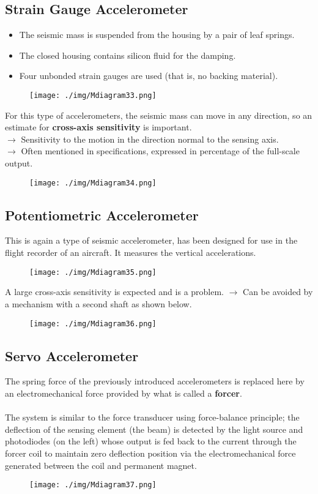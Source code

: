 \subsection{Strain Gauge Accelerometer}
\begin{itemize}
  \item The seismic mass is suspended from the housing by a pair of leaf springs.
  \item The closed housing contains silicon fluid for the damping.
  \item Four unbonded strain gauges are used (that is, no backing material).
\end{itemize}
\begin{figure}[H]
  \centering
  \texttt{[image: ./img/Mdiagram33.png]}
\end{figure}
For this type of accelerometers, the seismic mass can move in any direction, so an estimate for \textbf{cross-axis sensitivity} is important. \\
$\rightarrow$ Sensitivity to the motion in the direction normal to the sensing axis. \\
$\rightarrow$ Often mentioned in specifications, expressed in percentage of the full-scale output.
\begin{figure}[H]
  \centering
  \texttt{[image: ./img/Mdiagram34.png]}
\end{figure}
\subsection{Potentiometric Accelerometer}
This is again a type of seismic accelerometer, has been designed for use in the flight recorder of an aircraft. It measures the vertical accelerations.
\begin{figure}[H]
  \centering
  \texttt{[image: ./img/Mdiagram35.png]}
\end{figure}
A large cross-axis sensitivity is expected and is a problem. $\longrightarrow$ Can be avoided by a mechanism with a second shaft as shown below.
\begin{figure}[H]
  \centering
  \texttt{[image: ./img/Mdiagram36.png]}
\end{figure}
\subsection{Servo Accelerometer}
The spring force of the previously introduced accelerometers is replaced here by an electromechanical force provided by what is called a \textbf{forcer}. \\\\
The system is similar to the force transducer using force-balance principle; the deflection of the sensing element (the beam) is detected by the light source and photodiodes (on the left) whose output is fed back to the current through the forcer coil to maintain zero deflection position via the electromechanical force generated between the coil and permanent magnet.
\begin{figure}[H]
  \centering
  \texttt{[image: ./img/Mdiagram37.png]}
\end{figure}
